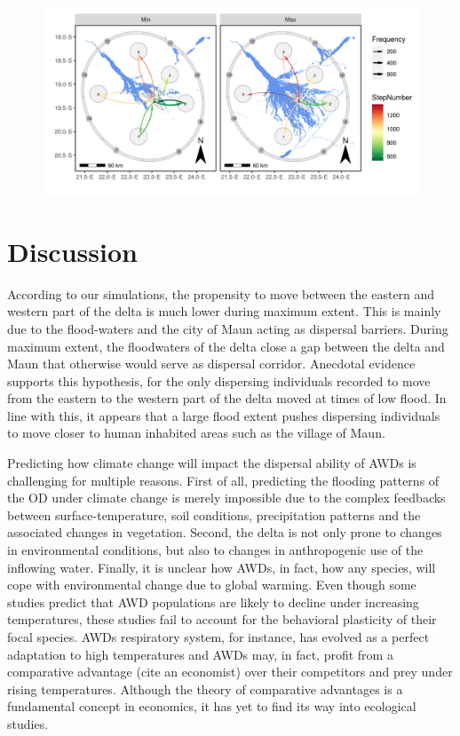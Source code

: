 \documentclass[abstract=on,10pt,a4paper,bibliography=totocnumbered]{article}
\begin{document}
\begin{figure}
  \begin{center}
  \includegraphics[width = \textwidth]{99_Interpatch.png}
  \caption{}
  \label{Interpatch}
  \end{center}
\end{figure}




\section{Discussion}
According to our simulations, the propensity to move between the eastern and
western part of the delta is much lower during maximum extent. This is mainly
due to the flood-waters and the city of Maun acting as dispersal barriers.
During maximum extent, the floodwaters of the delta close a gap between the
delta and Maun that otherwise would serve as dispersal corridor. Anecdotal
evidence supports this hypothesis, for the only dispersing individuals recorded
to move from the eastern to the western part of the delta moved at times of low
flood. In line with this, it appears that a large flood extent pushes dispersing
individuals to move closer to human inhabited areas such as the village of Maun.

Predicting how climate change will impact the dispersal ability of AWDs is
challenging for multiple reasons. First of all, predicting the flooding patterns
of the OD under climate change is merely impossible due to the complex feedbacks
between surface-temperature, soil conditions, precipitation patterns and the
associated changes in vegetation. Second, the delta is not only prone to changes
in environmental conditions, but also to changes in anthropogenic use of the
inflowing water. Finally, it is unclear how AWDs, in fact, how any
species, will cope with environmental change due to global warming. Even though
some studies predict that AWD populations are likely to decline under increasing
temperatures, these studies fail to account for the behavioral plasticity of
their focal species. AWDs respiratory system, for instance, has evolved as a
perfect adaptation to high temperatures and AWDs may, in fact, profit from a
comparative advantage (cite an economist) over their competitors and prey under
rising temperatures. Although the theory of comparative advantages is a
fundamental concept in economics, it has yet to find its way into ecological
studies.
\end{document}
